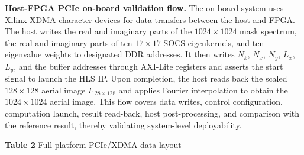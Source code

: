 \documentclass[
  preprint]{elsarticle}
\begin{document}
\textbf{Host-FPGA PCIe on-board validation flow.} The on-board system
uses Xilinx XDMA character devices for data transfers between the host
and FPGA. The host writes the real and imaginary parts of the
\(1024 \times 1024\) mask spectrum, the real and imaginary parts of ten
\(17 \times 17\) SOCS eigenkernels, and ten eigenvalue weights to
designated DDR addresses. It then writes \(N_k\), \(N_x\), \(N_y\),
\(L_x\), \(L_y\), and the buffer addresses through AXI-Lite registers
and asserts the start signal to launch the HLS IP. Upon completion, the
host reads back the scaled \(128 \times 128\) aerial image
\(I_{128\times128}\) and applies Fourier interpolation to obtain the
\(1024 \times 1024\) aerial image. This flow covers data writes, control
configuration, computation launch, result read-back, host
post-processing, and comparison with the reference result, thereby
validating system-level deployability.

\textbf{Table 2} Full-platform PCIe/XDMA data layout
\end{document}
